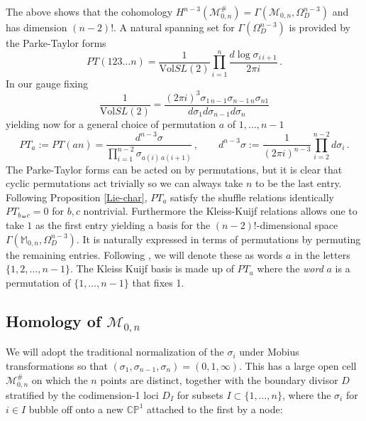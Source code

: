 \documentclass[11pt]{article}
\newcommand{\CP}{\mathbb{CP}}
\newcommand{\M}{\mathbb{M}}
\newcommand{\cM}{\mathcal{M}}
\newcommand{\1}{{\rm 1\hskip-0.25em I}}
\begin{document}
 The above shows that the cohomology $H^{n-3}(\cM_{0,n}^\#)=\Gamma (\cM_{0,n},\Omega^{n-3}_D)$ and has dimension $(n-2)!$.  A natural spanning set for 
 $\Gamma(\Omega^{n-3}_D)$ is provided by the Parke-Taylor forms  
\begin{equation}
PT(123\ldots n)=\frac{1}{\mathrm{Vol}SL(2)} \prod_{i=1}^n \frac{d\log \sigma_{i\, i+1}}{2\pi i}\, .
\end{equation}
In our gauge fixing 
\begin{equation}
\frac{1}{\mathrm{Vol}SL(2)}=\frac{(2\pi i)^3\sigma_{1\, n-1}\sigma_{n-1\, n}\sigma_{n1}}{d\sigma_1d\sigma_{n-1} d\sigma_n}
\end{equation}
yielding now for a general choice of permutation $a$ of $1,\ldots ,n-1$
\begin{equation}
PT_a:=PT(a n)=\frac{d^{n-3}\sigma }{\prod_{i=1}^{n-2} 
\sigma_{{a(i)\, a(i+1)}}} \, , \qquad d^{n-3}\sigma:=\frac{1}{(2\pi i)^{n-3}}\prod_{i=2}^{n-2} d\sigma_i\, .
\end{equation}
The Parke-Taylor forms can be acted on by permutations, but it is clear that cyclic permutations act trivially so we can always take $n$ to be the last entry. Following Proposition \ref{Lie-char}, $PT_a$ satisfy the shuffle relations identically $PT_{b\shuffle c}=0$ for $b,c$ nontrivial.  Furthermore the Kleiss-Kuijf relations allows one to take $1$ as the first entry yielding a basis for the $(n-2)!$-dimensional space $\Gamma(\M_{0,n},\Omega^{n-3}_D)$. It is naturally expressed in terms of permutations  by permuting the remaining entries. Following \cite{Reutenauer}, we will denote these as words $a$ in the letters $\{1,2,\ldots ,n-1\}$. The Kleiss Kuijf basis is made up of $PT_a$ where the \emph{word} $a$ is a permutation of $\{1,\ldots, n-1\}$ that fixes 1.



\subsection{Homology of $\cM_{0,n}$}
We will adopt the traditional normalization of  the $\sigma_i$ under Mobius transformations so that $(\sigma_1,\sigma_{n-1},\sigma_n)=(0,1,\infty)$. This has a large open cell $\cM_{0,n}^\#$ on which the $n$ points are distinct, together with the boundary divisor $D$ stratified by the codimension-1 loci $D_I$ for subsets $I\subset\{1,\ldots,n\}$, where the $\sigma_i$ for $i\in I$  bubble off onto a new $\CP^1$ attached to the first by a node:
\end{document}
